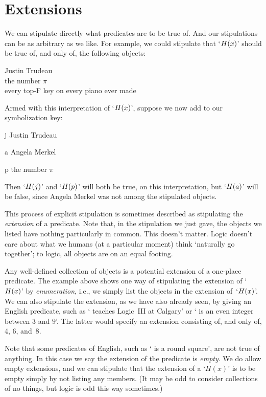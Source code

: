 \section{Extensions}\label{sec:extensions}
We can stipulate directly what predicates are to be true of. And our stipulations can be as arbitrary as we like. For example, we could stipulate that `$\mathord{H}(x)$' should be true of, and only of, the following objects:
	\begin{center}
		Justin Trudeau\\
		the number $\pi$\\
		every top-F key on every piano ever made
	\end{center}
Armed with this interpretation of `$\mathord{H}(x)$', suppose we now add to our symbolization key:
	\begin{ekey}
		\item[j] Justin Trudeau
		\item[a] Angela Merkel
		\item[p] the number $\pi$
	\end{ekey}
Then `$\mathord{H}(j)$' and `$\mathord{H}(p)$' will both be true, on this interpretation, but `$\mathord{H}(a)$' will be false, since Angela Merkel was not among the stipulated objects.

This process of explicit stipulation is sometimes described as stipulating the \emph{extension} of a predicate. Note that, in the stipulation we just gave, the objects we listed have nothing particularly in common. This doesn't matter. Logic doesn't care about what we humans (at a particular moment) think `naturally go together'; to logic, all objects are on an equal footing.

Any well-defined collection of objects is a potential extension of a one-place predicate.  The example above shows one way of stipulating the extension of `$\mathord{H}(x)$' by \emph{enumeration}, i.e., we simply list the objects in the extension of~`$\mathord{H}(x)$'. We can also stipulate the extension, as we have also already seen, by giving an English predicate, such as ` teaches Logic~III at Calgary' or ` is an even integer between $3$ and $9$'. The latter would specify an extension consisting of, and only of, $4$, $6$, and~$8$.

Note that some predicates of English, such as ` is a round square', are not true of anything.  In this case we say the extension of the predicate is \emph{empty}.  We do allow empty extensions, and we can stipulate that the extension of a `$H(x)$' is to be empty simply by not listing any members. (It may be odd to consider collections of no things, but logic is odd this way sometimes.)


